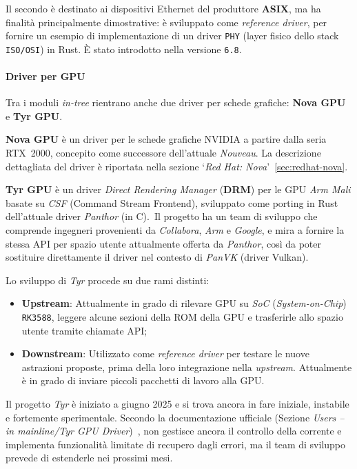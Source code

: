 Il secondo è destinato ai dispositivi Ethernet del produttore \textbf{ASIX}, ma ha finalità principalmente dimostrative:
è sviluppato come \textit{reference driver}, per fornire un esempio di implementazione di un driver \texttt{PHY} (layer fisico dello stack \texttt{ISO/OSI}) in Rust.
È stato introdotto nella versione \texttt{6.8}.

\paragraph{Driver per GPU}
Tra i moduli \textit{in-tree} rientrano anche due driver per schede grafiche: \textbf{Nova GPU} e \textbf{Tyr GPU}.\ 

\textbf{Nova GPU} è un driver per le schede grafiche NVIDIA a partire dalla seria RTX~2000, concepito come successore dell'attuale \textit{Nouveau}.
La descrizione dettagliata del driver è riportata nella sezione `\textit{Red Hat: Nova}'~\ref{sec:redhat-nova}.

\textbf{Tyr GPU} è un driver \textit{Direct Rendering Manager} (\textbf{DRM}) per le GPU \textit{Arm Mali} basate su \textit{CSF} (Command Stream Frontend), 
sviluppato come porting in Rust dell'attuale driver \textit{Panthor} (in C).\ 
Il progetto ha un team di sviluppo che comprende ingegneri provenienti da \textit{Collabora}, \textit{Arm} e \textit{Google}, e mira a fornire la 
stessa API per spazio utente attualmente offerta da \textit{Panthor}, così da poter sostituire direttamente il driver nel contesto di \textit{PanVK} (driver Vulkan).

\noindent Lo sviluppo di \textit{Tyr} procede su due rami distinti:
\begin{itemize}
    \item \textbf{Upstream}: Attualmente in grado di rilevare GPU su \textit{SoC} (\textit{System-on-Chip}) \texttt{RK3588}, leggere alcune sezioni della ROM della GPU e trasferirle allo spazio utente tramite chiamate API;\ 
    \item \textbf{Downstream}: Utilizzato come \textit{reference driver} per testare le nuove astrazioni proposte, prima della loro integrazione nella \textit{upstream}. Attualmente è in grado di inviare piccoli pacchetti di lavoro alla GPU.\ 
\end{itemize}
Il progetto \textit{Tyr} è iniziato a giugno 2025 e si trova ancora in fare iniziale, instabile e fortemente sperimentale.
Secondo la documentazione ufficiale (Sezione \textit{Users -- in mainline/Tyr GPU Driver})~\cite{rust-for-linux}, non gestisce ancora il controllo della corrente e implementa funzionalità limitate di recupero dagli errori, 
ma il team di sviluppo prevede di estenderle nei prossimi mesi.

